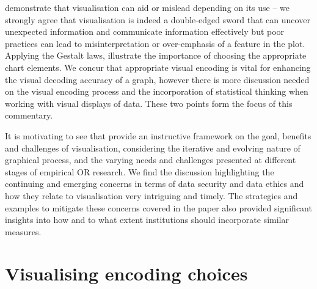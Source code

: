 \documentclass[ijds,nonblindrev]{informs-ijds}
\begin{document}
\citet{basole2021} demonstrate that visualisation can aid or mislead depending on its use -- we strongly agree that visualisation is indeed a double-edged sword that can uncover unexpected information and communicate information effectively but poor practices can lead to misinterpretation or over-emphasis of a feature in the plot. Applying the Gestalt laws, \citet{basole2021} illustrate the importance of choosing the appropriate chart elements. We concur that appropriate visual encoding is vital for enhancing the visual decoding accuracy of a graph, however there is more discussion needed on the visual encoding process and the incorporation of statistical thinking when working with visual displays of data. These two points form the focus of this commentary. %

It is motivating to see that \citet{basole2021} provide an instructive framework on the goal, benefits and challenges of visualisation, considering the iterative and evolving nature of graphical process, and the varying needs and challenges presented at different stages of empirical OR research. We find the discussion highlighting the continuing and emerging concerns in terms of data security and data ethics and how they relate to visualisation very intriguing and timely. The strategies and examples to mitigate these concerns covered in the paper also provided significant insights into how and to what extent institutions should incorporate similar measures.

\section{Visualising encoding choices} \label{sec:plotdesign}
\end{document}
